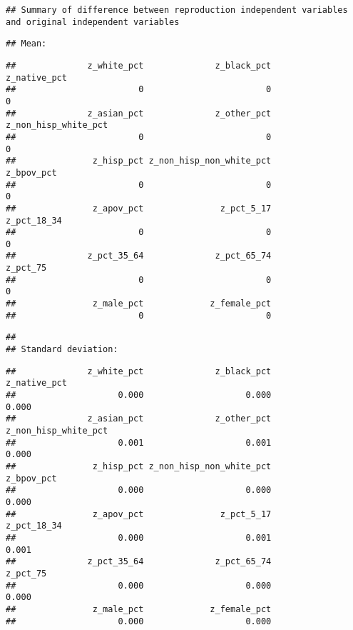 \documentclass[
]{article}
\begin{document}
\begin{verbatim}
## Summary of difference between reproduction independent variables and original independent variables
\end{verbatim}

\begin{verbatim}
## Mean:
\end{verbatim}

\begin{verbatim}
##              z_white_pct              z_black_pct             z_native_pct 
##                        0                        0                        0 
##              z_asian_pct              z_other_pct     z_non_hisp_white_pct 
##                        0                        0                        0 
##               z_hisp_pct z_non_hisp_non_white_pct               z_bpov_pct 
##                        0                        0                        0 
##               z_apov_pct               z_pct_5_17              z_pct_18_34 
##                        0                        0                        0 
##              z_pct_35_64              z_pct_65_74                 z_pct_75 
##                        0                        0                        0 
##               z_male_pct             z_female_pct 
##                        0                        0
\end{verbatim}

\begin{verbatim}
## 
## Standard deviation:
\end{verbatim}

\begin{verbatim}
##              z_white_pct              z_black_pct             z_native_pct 
##                    0.000                    0.000                    0.000 
##              z_asian_pct              z_other_pct     z_non_hisp_white_pct 
##                    0.001                    0.001                    0.000 
##               z_hisp_pct z_non_hisp_non_white_pct               z_bpov_pct 
##                    0.000                    0.000                    0.000 
##               z_apov_pct               z_pct_5_17              z_pct_18_34 
##                    0.000                    0.001                    0.001 
##              z_pct_35_64              z_pct_65_74                 z_pct_75 
##                    0.000                    0.000                    0.000 
##               z_male_pct             z_female_pct 
##                    0.000                    0.000
\end{verbatim}
\end{document}

